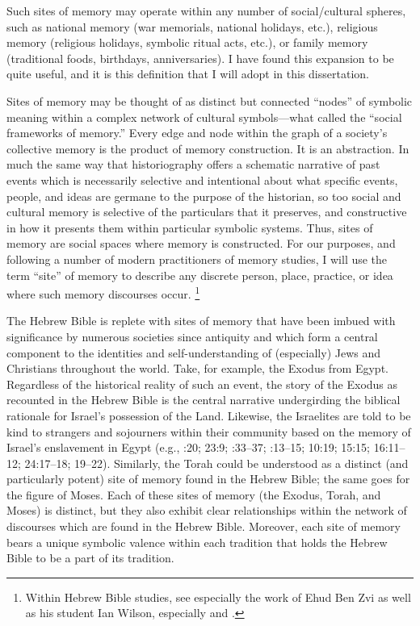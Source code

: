 Such sites of memory may operate within any number of social/cultural spheres, such as national memory (war memorials, national holidays, etc.), religious memory (religious holidays, symbolic ritual acts, etc.), or family memory (traditional foods, birthdays, anniversaries). I have found this expansion to be quite useful, and it is this definition that I will adopt in this dissertation.

Sites of memory may be thought of as distinct but connected ``nodes'' of symbolic meaning within a complex network of cultural symbols---what \halbwachs called the ``social frameworks of memory.''%
    \autocite[38]{halbwachs1992}  
Every edge and node within the graph of a society's collective memory is the product of memory construction. It is an abstraction. In much the same way that historiography offers a schematic narrative of past events which is necessarily selective and intentional about what specific events, people, and ideas are germane to the purpose of the historian, so too social and cultural memory is selective of the particulars that it preserves, and constructive in how it presents them within particular symbolic systems. Thus, sites of memory are social spaces where memory is constructed. For our purposes, and following a number of modern practitioners of memory studies, I will use the term ``site'' of memory to describe any discrete person, place, practice, or idea where such memory discourses occur.%
    \footnote{%
        Within Hebrew Bible studies, see especially the work of Ehud Ben Zvi as well as his student Ian Wilson, especially
        \cite[72--74]{benzvi_st2017} and 
        \cite[25--26]{wilson2017}.}

The Hebrew Bible is replete with sites of memory that have been imbued with significance by numerous societies since antiquity and which form a central component to the identities and self-understanding of (especially) Jews and Christians throughout the world. Take, for example, the Exodus from Egypt. Regardless of the historical reality of such an event, the story of the Exodus as recounted in the Hebrew Bible is the central narrative undergirding the biblical rationale for Israel's possession of the Land. Likewise, the Israelites are told to be kind to strangers and sojourners within their community based on the memory of Israel's enslavement in Egypt (e.g., :20; 23:9; :33--37; :13--15; 10:19; 15:15; 16:11--12; 24:17--18; 19--22). Similarly, the Torah could be understood as a distinct (and particularly potent) site of memory found in the Hebrew Bible; the same goes for the figure of Moses. Each of these sites of memory (the Exodus, Torah, and Moses) is distinct, but they also exhibit clear relationships within the network of discourses which are found in the Hebrew Bible. Moreover, each site of memory bears a unique symbolic valence within each tradition that holds the Hebrew Bible to be a part of its tradition.

